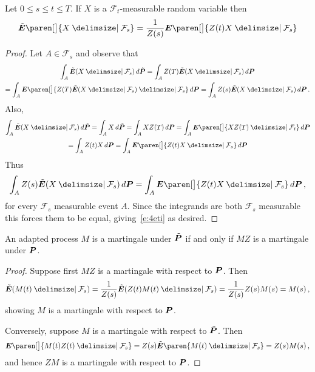 \begin{lemma}
  Let $0 \leq s \leq t \leq T$.
  If $X$ is a $\mathcal F_t$-measurable random variable then
  \begin{equation}\label{e:4eti}
    \tilde\E\paren[\big]{ X \given \mathcal F_s }
      = \frac{1}{Z(s)} \E \paren[\big]{ Z(t) X \given \mathcal F_s }
  \end{equation}
\end{lemma}
\begin{proof}
  Let $A \in \mathcal F_s$ and observe that
  \begin{multline*}
    \int_A \tilde\E( X \given \mathcal F_s ) \, d\tilde\P
      = \int_A Z(T) \tilde\E( X \given \mathcal F_s ) \, d\P
    \\
      = \int_A \E\paren[\big]{
	  Z(T) \tilde\E( X \given \mathcal F_s ) \given \mathcal F_s} \, d\P
      = \int_A Z(s) \tilde\E( X \given \mathcal F_s )\, d\P\,.
  \end{multline*}
  Also,
  \begin{multline*}
    \int_A \tilde\E( X \given \mathcal F_s ) \, d\tilde\P
      = \int_A X \, d\tilde \P
      = \int_A X Z(T) \, d\P
      = \int_A \E\paren[\big]{ X Z(T) \given \mathcal F_t } \, d\P
  \\
      = \int_A Z(t) X \, d\P
      = \int_A \E\paren[\big]{ Z(t) X \given \mathcal F_s} \, d\P
  \end{multline*}
  Thus 
  \begin{equation*}
    \int_A Z(s) \tilde\E( X \given \mathcal F_s )\, d\P
      = \int_A \E\paren[\big]{ Z(t) X \given \mathcal F_s} \, d\P\,,
  \end{equation*}
  for every $\mathcal F_s$ measurable event $A$.
  Since the integrands are both $\mathcal F_s$ measurable this forces them to be equal, giving~\eqref{e:4eti} as desired.
\end{proof}

\begin{lemma}\label{l:4pmg}
  An adapted process $M$ is a martingale under $\tilde\P$ if and only if $MZ$ is a martingale under $\P$.
\end{lemma}
\begin{proof}
  Suppose first $MZ$ is a martingale with respect to $\P$.
  Then
  \begin{equation*}
    \tilde\E( M(t) \given \mathcal F_s )
      = \frac{1}{Z(s)} \tilde\E( Z(t) M(t) \given \mathcal F_s )
      = \frac{1}{Z(s)} Z(s) M(s) = M(s)\,,
  \end{equation*}
  showing $M$ is a martingale with respect to $\P$.

  Conversely, suppose $M$ is a martingale with respect to $\tilde\P$.
  Then
  \begin{equation*}
    \E\paren[\big]{ M(t) Z(t) \given \mathcal F_s }
      = Z(s) \tilde\E\paren{ M(t) \given \mathcal F_s }
      = Z(s) M(s)\,,
  \end{equation*}
  and hence $ZM$ is a martingale with respect to $\P$.
\end{proof}


